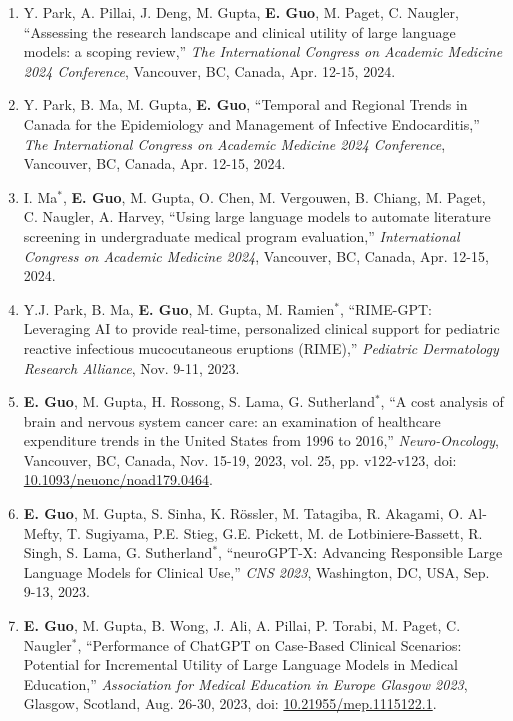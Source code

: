 \documentclass{article}
\begin{document}
\begin{enumerate}
    \item Y. Park, A. Pillai, J. Deng, M. Gupta, \textbf{E. Guo}, M. Paget, C. Naugler, ``Assessing the research landscape and clinical utility of large language models: a scoping review,'' \textit{The International Congress on Academic Medicine 2024 Conference}, Vancouver, BC, Canada, Apr. 12-15, 2024.
    \item Y. Park, B. Ma, M. Gupta, \textbf{E. Guo}, ``Temporal and Regional Trends in Canada for the Epidemiology and Management of Infective Endocarditis,'' \textit{The International Congress on Academic Medicine 2024 Conference}, Vancouver, BC, Canada, Apr. 12-15, 2024.
    \item I. Ma$^*$, \textbf{E. Guo}, M. Gupta, O. Chen, M. Vergouwen, B. Chiang, M. Paget, C. Naugler, A. Harvey, ``Using large language models to automate literature screening in undergraduate medical program evaluation,'' \textit{International Congress on Academic Medicine 2024}, Vancouver, BC, Canada, Apr. 12-15, 2024.
    \item Y.J. Park, B. Ma, \textbf{E. Guo}, M. Gupta, M. Ramien$^*$, ``RIME-GPT:  Leveraging AI to provide real-time, personalized clinical support for pediatric reactive infectious mucocutaneous eruptions (RIME),'' \textit{Pediatric Dermatology Research Alliance}, Nov. 9-11, 2023.
    \item \textbf{E. Guo}, M. Gupta, H. Rossong, S. Lama, G. Sutherland$^*$, ``A cost analysis of brain and nervous system cancer care: an examination of healthcare expenditure trends in the United States from 1996 to 2016,'' \textit{Neuro-Oncology}, Vancouver, BC, Canada, Nov. 15-19, 2023, vol. 25, pp. v122-v123, doi: \href{https://doi.org/10.1093/neuonc/noad179.0464}{10.1093/neuonc/noad179.0464}.
    \item \textbf{E. Guo}, M. Gupta, S. Sinha, K. R\"ossler, M. Tatagiba, R. Akagami, O. Al-Mefty, T. Sugiyama, P.E. Stieg, G.E. Pickett, M. de Lotbiniere-Bassett, R. Singh, S. Lama, G. Sutherland$^*$, ``neuroGPT-X: Advancing Responsible Large Language Models for Clinical Use,'' \textit{CNS 2023}, Washington, DC, USA, Sep. 9-13, 2023.
    \item \textbf{E. Guo}, M. Gupta, B. Wong, J. Ali, A. Pillai, P. Torabi, M. Paget, C. Naugler$^*$, ``Performance of ChatGPT on Case-Based Clinical Scenarios: Potential for Incremental Utility of Large Language Models in Medical Education,'' \textit{Association for Medical Education in Europe Glasgow 2023}, Glasgow, Scotland, Aug. 26-30, 2023, doi: \href{https://doi.org/10.21955/mep.1115122.1}{10.21955/mep.1115122.1}.

\end{enumerate}
\end{document}

